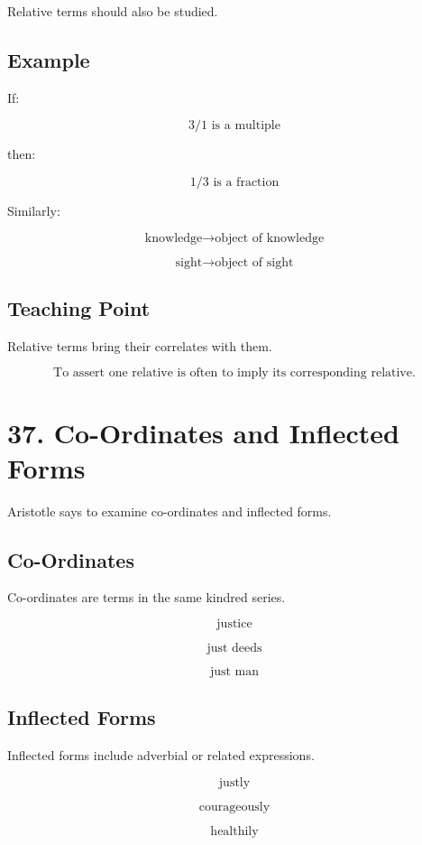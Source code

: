 \documentclass[12pt]{article}
\begin{document}
Relative terms should also be studied.

\subsection*{Example}

If:

\[
3/1 \text{ is a multiple}
\]

then:

\[
1/3 \text{ is a fraction}
\]

Similarly:

\[
\text{knowledge} \rightarrow \text{object of knowledge}
\]

\[
\text{sight} \rightarrow \text{object of sight}
\]

\subsection*{Teaching Point}

Relative terms bring their correlates with them.

\[
\boxed{
\text{To assert one relative is often to imply its corresponding relative.}
}
\]

\section*{37. Co-Ordinates and Inflected Forms}

Aristotle says to examine co-ordinates and inflected forms.

\subsection*{Co-Ordinates}

Co-ordinates are terms in the same kindred series.

\[
\text{justice}
\]

\[
\text{just deeds}
\]

\[
\text{just man}
\]

\subsection*{Inflected Forms}

Inflected forms include adverbial or related expressions.

\[
\text{justly}
\]

\[
\text{courageously}
\]

\[
\text{healthily}
\]
\end{document}
